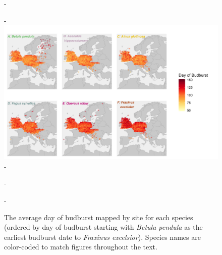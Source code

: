 \documentclass{article}\usepackage[]{graphicx}\usepackage[]{color}
\begin{document}
{\begin{figure} [H]
  -\begin{center}
  -\includegraphics[width=14cm]{..//analyses/figures/BB_base.png}
  -\caption{The average day of budburst mapped by site for each species (ordered by day of budburst starting with \textit{Betula pendula} as the earliest budburst date to \textit{Fraxinus excelsior}). Species names are color-coded to match figures throughout the text. }\label{fig:bbmap}
  -\end{center}
  -\end{figure}}
  
\end{document}
